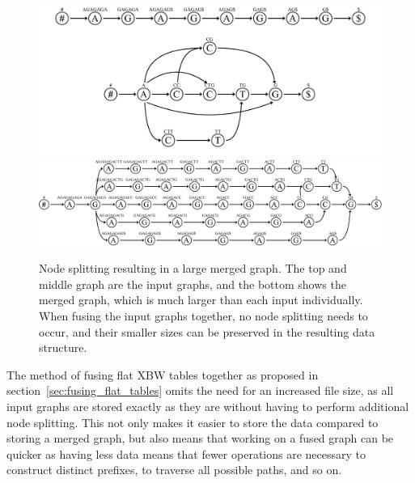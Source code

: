 \documentclass[a4paper,12pt,twoside,BCOR=10mm]{scrbook}
\begin{document}
\begin{figure}[!htb]
\centering
\includegraphics[width=\textwidth]{evo_fig_massive_split.pdf}
\includegraphics[width=\textwidth]{evo_fig_massive_split_3.pdf}
\caption[Node splitting resulting in large merged graph]{Node splitting resulting in a large merged graph. The top and middle graph are the input graphs, and the bottom shows the merged graph, which is much larger than each input individually. When fusing the input graphs together, no node splitting needs to occur, and their smaller sizes can be preserved in the resulting data structure.} \label{fig:evo_fig_massive_split}
\end{figure}

The method of fusing flat XBW tables together as proposed in section~\ref{sec:fusing_flat_tables} omits
the need for an increased file size,
as all input graphs are stored exactly as they are without having to perform additional node splitting.
This not only makes it easier to store the data compared to storing a merged graph,
but also means that working on
a fused graph can be quicker as having less data means that fewer operations are necessary to construct
distinct prefixes, to traverse all possible paths, and so on.
\end{document}
